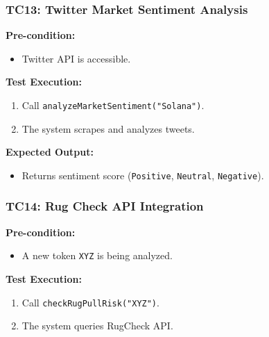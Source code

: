 \documentclass[
]{article}
\providecommand{\tightlist}{%
  \setlength{\itemsep}{0pt}\setlength{\parskip}{0pt}}
\begin{document}
\hypertarget{tc13-twitter-market-sentiment-analysis}{%
\subsubsection{\texorpdfstring{\textbf{TC13: Twitter Market Sentiment
Analysis}}{TC13: Twitter Market Sentiment Analysis}}\label{tc13-twitter-market-sentiment-analysis}}

\textbf{Pre-condition:}

\begin{itemize}
\tightlist
\item
  Twitter API is accessible.
\end{itemize}

\textbf{Test Execution:}

\begin{enumerate}
\def\labelenumi{\arabic{enumi}.}
\tightlist
\item
  Call \texttt{analyzeMarketSentiment("Solana")}.
\item
  The system scrapes and analyzes tweets.
\end{enumerate}

\textbf{Expected Output:}

\begin{itemize}
\tightlist
\item
  Returns sentiment score (\texttt{Positive}, \texttt{Neutral},
  \texttt{Negative}).
\end{itemize}

\hypertarget{tc14-rug-check-api-integration}{%
\subsubsection{\texorpdfstring{\textbf{TC14: Rug Check API
Integration}}{TC14: Rug Check API Integration}}\label{tc14-rug-check-api-integration}}

\textbf{Pre-condition:}

\begin{itemize}
\tightlist
\item
  A new token \texttt{XYZ} is being analyzed.
\end{itemize}

\textbf{Test Execution:}

\begin{enumerate}
\def\labelenumi{\arabic{enumi}.}
\tightlist
\item
  Call \texttt{checkRugPullRisk("XYZ")}.
\item
  The system queries RugCheck API.
\end{enumerate}
\end{document}
